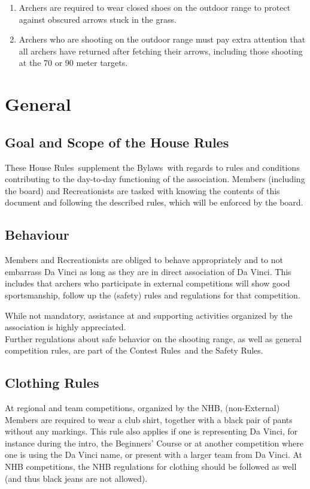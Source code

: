 \documentclass[a4paper]{article}
\newcommand{\Asta}{Bylaws} %
\newcommand{\Ahr}{House Rules} %
\newcommand{\Asr}{Safety Rules} %
\newcommand{\Awr}{Contest Rules} %
\begin{document}
\begin{enumerate}
  \item Archers are required to wear closed shoes on the outdoor range to protect against obscured arrows stuck in the grass.
  \item Archers who are shooting on the outdoor range must pay extra attention that all archers have returned after fetching their arrows, including those shooting at the 70 or 90 meter targets.
\end{enumerate}

\section{General}
\subsection{Goal and Scope of the \Ahr}
These \Ahr\ supplement the \Asta\ with regards to rules and conditions contributing to the day-to-day functioning of the association. Members (including the board) and Recreationists are tasked with knowing the contents of this document and following the described rules, which will be enforced by the board. \\

\subsection{Behaviour}
Members and Recreationists are obliged to behave appropriately and to not embarrass Da Vinci as long as they are in direct association of Da Vinci. This includes that archers who participate in external competitions will show good sportsmanship, follow up the (safety) rules and regulations for that competition. 

While not mandatory, assistance at and supporting activities organized by the association is highly appreciated. \\

Further regulations about safe behavior on the shooting range, as well as general competition rules, are part of the \Awr\ and the \Asr .

\subsection{Clothing Rules}
\label{section:clubclothing}
At regional and team competitions, organized by the NHB, (non-External) Members are required to wear a club shirt, together with a black pair of pants without any markings. This rule also applies if one is representing Da Vinci, for instance during the intro, the Beginners' Course or at another competition where one is using the Da Vinci name, or present with a larger team from Da Vinci. At NHB competitions, the NHB regulations for clothing should be followed as well (and thus black jeans are not allowed).
\end{document}
